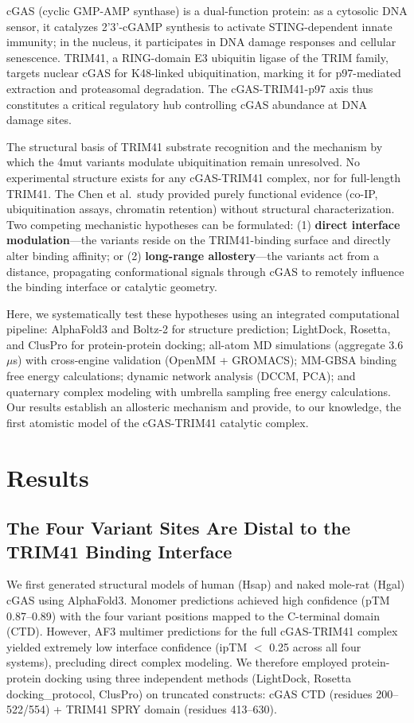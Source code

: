 \documentclass[journal=jcisd8, manuscript=article]{achemso}
\begin{document}
cGAS (cyclic GMP-AMP synthase) is a dual-function protein: as a cytosolic DNA sensor, it catalyzes 2'3'-cGAMP synthesis to activate STING-dependent innate immunity;\cite{motani2023} in the nucleus, it participates in DNA damage responses and cellular senescence.\cite{harding2017} TRIM41, a RING-domain E3 ubiquitin ligase of the TRIM family, targets nuclear cGAS for K48-linked ubiquitination, marking it for p97-mediated extraction and proteasomal degradation.\cite{zhen2023} The cGAS-TRIM41-p97 axis thus constitutes a critical regulatory hub controlling cGAS abundance at DNA damage sites.

The structural basis of TRIM41 substrate recognition and the mechanism by which the 4mut variants modulate ubiquitination remain unresolved. No experimental structure exists for any cGAS-TRIM41 complex, nor for full-length TRIM41. The Chen et al.\ study provided purely functional evidence (co-IP, ubiquitination assays, chromatin retention) without structural characterization. Two competing mechanistic hypotheses can be formulated: (1) \textbf{direct interface modulation}---the variants reside on the TRIM41-binding surface and directly alter binding affinity; or (2) \textbf{long-range allostery}---the variants act from a distance, propagating conformational signals through cGAS to remotely influence the binding interface or catalytic geometry.

Here, we systematically test these hypotheses using an integrated computational pipeline: AlphaFold3 and Boltz-2 for structure prediction; LightDock, Rosetta, and ClusPro for protein-protein docking; all-atom MD simulations (aggregate 3.6 $\mu$s) with cross-engine validation (OpenMM + GROMACS); MM-GBSA binding free energy calculations; dynamic network analysis (DCCM, PCA); and quaternary complex modeling with umbrella sampling free energy calculations. Our results establish an allosteric mechanism and provide, to our knowledge, the first atomistic model of the cGAS-TRIM41 catalytic complex.

\section{Results}

\subsection{The Four Variant Sites Are Distal to the TRIM41 Binding Interface}

We first generated structural models of human (Hsap) and naked mole-rat (Hgal) cGAS using AlphaFold3. Monomer predictions achieved high confidence (pTM 0.87--0.89) with the four variant positions mapped to the C-terminal domain (CTD). However, AF3 multimer predictions for the full cGAS-TRIM41 complex yielded extremely low interface confidence (ipTM $<$ 0.25 across all four systems), precluding direct complex modeling. We therefore employed protein-protein docking using three independent methods (LightDock, Rosetta docking\_protocol, ClusPro) on truncated constructs: cGAS CTD (residues 200--522/554) + TRIM41 SPRY domain (residues 413--630).
\end{document}
